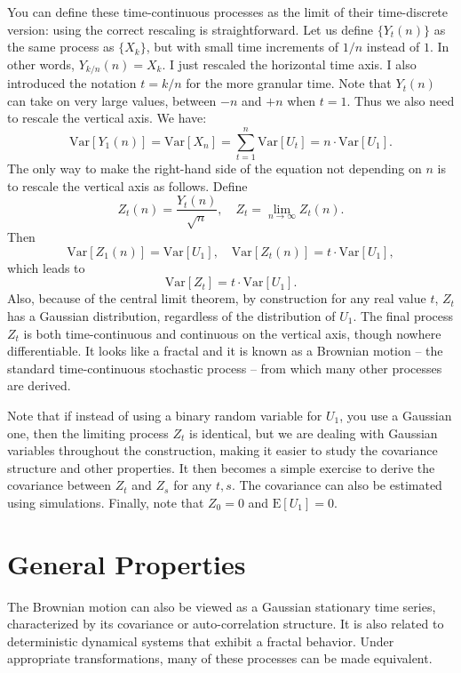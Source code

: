 \documentclass[oneside,10pt]{book}
\begin{document}
You can define these time-continuous processes as the limit of their time-discrete version: using the correct rescaling is straightforward. Let us define $\{Y_t(n)\}$ as the same process as $\{X_k\}$, but with small time increments of $1/n$ instead of $1$.  In other words, $Y_{k/n}(n) = X_k$. I just rescaled the horizontal time axis. I also introduced the notation $t=k/n$ for the more granular time. Note that $Y_t(n)$ can  take on very large values, between $-n$ and $+n$ when $t = 1$. Thus we also need to rescale the vertical axis. We have:
$$
\text{Var}[Y_1(n)] =\text{Var}[X_n]  = \sum_{t=1}^n \text{Var}[U_t] = n\cdot \text{Var}[U_1].
$$
The only way to make the right-hand side of the equation not depending on $n$ is to rescale the vertical axis as follows. Define
$$
Z_t(n) = \frac{Y_t(n)}{\sqrt{n}}, \quad Z_t = \lim_{n\rightarrow\infty} Z_t(n).
$$
Then
$$
\text{Var}[Z_1(n)] = \text{Var}[U_1], \quad \text{Var}[Z_t(n)] = t\cdot \text{Var}[U_1],
$$
which leads to
\begin{equation}
\text{Var}[Z_t] = t \cdot \text{Var}[U_1].\label{eq1}
\end{equation}
Also, because of the central limit theorem, by construction for any real value $t$, $Z_t$ has a Gaussian distribution, regardless of the distribution of $U_1$. The final process $Z_t$ is both time-continuous and continuous on the vertical axis, though nowhere differentiable. It looks like a fractal and it is known as a Brownian motion -- the standard time-continuous stochastic process -- from which many other processes are derived.

Note that if instead of using a binary random variable for $U_1$, you use a Gaussian one, then the limiting process
$Z_t$ is identical, but we are dealing with Gaussian variables throughout the construction, making it easier to study the covariance structure and other properties. It then becomes a simple exercise to derive the covariance between $Z_t$ and $Z_s$ for any $t,s$. The covariance can also be estimated using simulations. Finally, note that $Z_0 = 0$ and $\text{E}[U_1] = 0$.

\section{General Properties}

The Brownian motion can also be viewed as a Gaussian stationary time series, characterized by its covariance or auto-correlation structure. It is also related to deterministic dynamical systems  that exhibit a fractal behavior. Under appropriate transformations, many of these processes can be made equivalent.
\end{document}
